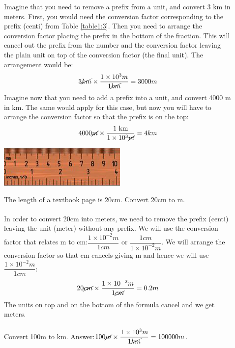 \documentclass[main.tex]{subfiles}
\begin{document}
\begin{description}
\item[] Imagine that you need to remove a prefix from a unit, and convert 3 km in meters. First, you would need the conversion factor corresponding to the prefix (centi) from Table \ref{table1:3}. Then you need to arrange the conversion factor placing the prefix in the bottom of the fraction. This will cancel out the prefix from the number and the conversion factor leaving the plain unit on top of the conversion factor (the final unit). The arrangement would be:
\begin{equation*}
3\cancel{km} \times \dfrac{1\times10^{3}m}{1\cancel{km}}=3000m
\end{equation*}
Imagine now that you need to add a prefix into a unit, and convert 4000 m in km. The same would apply for this case, but now you will have to arrange the conversion factor so that the prefix is on the top:
\begin{equation*}
4000\cancel{m} \times \dfrac{\text{1 km}}{1\times10^{3}\cancel{m}}=4km
\end{equation*}

\begin{marginfigure}
      \includegraphics{chapter1/figure1-6}
      \caption{Rulers normally have the cm and inch conversion written.}
      \label{fig:marginfig6}
   \end{marginfigure}

\begin{example} %
The length of a textbook page is 20cm. Convert 20cm to m.\\
\\
In order to convert 20cm into meters, we need to remove the prefix (centi) leaving the unit (meter) without any prefix. We will use the conversion factor that relates m to cm:$\dfrac{1\times10^{-2}m}{1cm}$ or $\dfrac{1cm}{1\times10^{-2}m}$. We will arrange the conversion factor so that cm cancels giving m and hence we will use $\dfrac{1\times10^{-2}m}{1cm}$:
 \begin{equation*}
20\cancel{cm} \times \dfrac{1\times10^{-2}m}{1\cancel{cm}}=0.2m
\end{equation*}
The units on top and on the bottom of the formula cancel and we get meters.
\\
\faDiamond\ \\
Convert 100m to km.
\flushright Answer:$100\cancel{m} \times \dfrac{1\times10^{3}m}{1\cancel{km}}=100000m$.
\end{example}%



\end{description}
\end{document}
